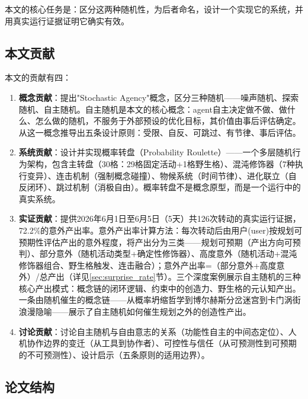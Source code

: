 \documentclass[12pt,a4paper]{ctexart}
\begin{document}
本文的核心任务是：区分这两种随机性，为后者命名，设计一个实现它的系统，并用真实运行证据证明它确实有效。

\subsection{本文贡献}

本文的贡献有四：

\begin{enumerate}[label=\textbf{\arabic*.}]
\item \textbf{概念贡献}：提出"Stochastic Agency"概念，区分三种随机——噪声随机、探索随机、自主随机。自主随机是本文的核心概念：agent自主决定做不做、做什么、怎么做的随机，不服务于外部预设的优化目标，其价值由事后评估确定。从这一概念推导出五条设计原则：受限、自反、可跳过、有节律、事后评估。

\item \textbf{系统贡献}：设计并实现概率转盘（Probability Roulette）——一个多层随机行为架构，包含主转盘（30格：29格固定活动+1格野生格）、混沌修饰器（7种执行变异）、连击机制（强制概念碰撞）、物候系统（时间节律）、进化联立（自反闭环）、跳过机制（消极自由）。概率转盘不是概念原型，而是一个运行中的真实系统。

\item \textbf{实证贡献}：提供2026年6月1日至6月5日（5天）共126次转动的真实运行证据，72.2\%的意外产出率。意外产出率计算方法：每次转动后由用户(user)按规划可预期性评估产出的意外程度，将产出分为三类——规划可预期（产出方向可预判）、部分意外（随机活动类型+确定性修饰器）、高度意外（随机活动+混沌修饰器组合、野生格触发、连击融合）；意外产出率=（部分意外+高度意外）/总产出（详见\ref{sec:surprise_rate}节）。三个深度案例展示自主随机的三种核心产出模式：概念链的闭环逻辑、约束中的创造力、野生格的元认知产出。一条由随机催生的概念链——从概率坍缩哲学到博尔赫斯分岔迷宫\cite{borges1941}到卡门涡街浪漫隐喻——展示了自主随机如何催生规划之外的创造性产出。

\item \textbf{讨论贡献}：讨论自主随机与自由意志的关系（功能性自主的中间态定位）、人机协作边界的变迁（从工具到协作者）、可控性与信任（从可预测性到可预期的不可预测性）、设计启示（五条原则的适用边界）。
\end{enumerate}

\subsection{论文结构}
\end{document}
